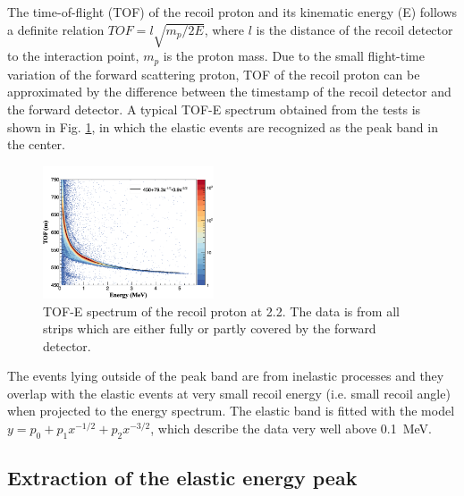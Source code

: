 \documentclass[number,5p]{elsarticle}
\begin{document}
The time-of-flight (TOF) of the recoil proton and its kinematic energy (E)
follows a definite relation $TOF = l\sqrt{m_p/2E}$, where $l$ is the distance of
the recoil detector to the interaction point, $m_p$ is the proton mass.
Due to the small flight-time variation of the forward scattering proton, TOF of the recoil proton can be approximated by the difference
between the timestamp of the recoil detector and the forward detector.
A typical TOF-E spectrum obtained from the tests is shown in Fig. \ref{fig:tof-e}, in which the elastic
events are recognized as the peak band in the center.
\begin{figure}[h!]
  \centering
  \includegraphics[width=0.45\textwidth]{./tof_e_cut.png}
  \caption{
    TOF-E spectrum of the recoil proton at \SI{2.2}{\momentum}. The data is from all
    strips which are either fully or partly covered by the forward detector.}
  \label{fig:tof-e}
\end{figure}
The events lying outside of the peak band are from inelastic processes and
they overlap with the elastic events at very small recoil energy (i.e. small recoil angle) when projected to the energy spectrum.
The elastic band is fitted with the model $y = p_{0} + p_{1}x^{-1/2} + p_{2}x^{-3/2}$,
which describe the data very well above \SI{0.1}{\MeV}.

\subsection{Extraction of the elastic energy peak}
\label{elastic_extraction}
\end{document}

